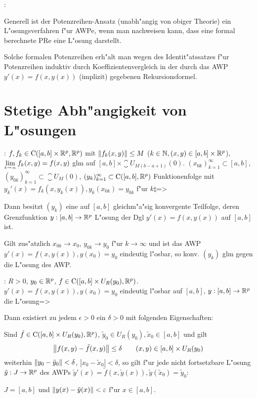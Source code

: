 \remark:{
  Generell ist der Potenzreihen-Ansatz (unabh"angig von obiger Theorie) ein
  L"osungsverfahren f"ur AWPe, wenn man nachweisen kann, dass eine
  formal berechnete PRe eine L"osung darstellt. 
  
  Solche formalen Potenzreihen erh"alt man wegen des Identit"atssatzes 
  f"ur Potenzreihen induktiv durch Koeffizientenvergleich in der
  durch das AWP $y'(x)=f(x,y(x))$ (implizit) gegebenen Rekursionsformel.
  }
\section{Stetige Abh"angigkeit von L"osungen}
\theorem:
  $f,f_k\in{\rm C}([a,b]\times\mathbb R^p,\mathbb R^p)$ mit
  ${\left\| f_k(x,y)\right\|}\leq M$ ($k\in\mathbb N,(x,y)\in[a,b]\times\mathbb R^p$),
  $\limes k->\infty f_k(x,y)=f(x,y)$ glm auf $[a,b]\times \closure{U_{M(b-a+1)}(0)}$.
  $(x_{0k})_{k=1}^\infty\subset [a,b]$, 
  $(y_{0k})_{k=1}^\infty\subset\closure{U_M(0)}$,
  $(y_k)_{k=1}^\infty\subset{\rm C}([a,b],\mathbb R^p)$ Funktionenfolge mit
  $y_k'(x)=f_k(x,y_k(x)),y_k(x_{0k})=y_{0k}$ f"ur $k\natural$=>{
  Dann besitzt $(y_k)$ eine auf $[a,b]$ gleichm"a"sig konvergente Teilfolge,
  deren Grenzfunktion $y:[a,b]\to\mathbb R^p$ L"osung der
  Dgl $y'(x)=f(x,y(x))$ auf $[a,b]$ ist.
  
  Gilt zus"atzlich $x_{0k}\to x_0$, $y_{0k}\to y_0$ f"ur $k\to\infty$ und
  ist das AWP $y'(x)=f(x,y(x)),y(x_0)=y_0$ eindeutig l"osbar, so konv.
  $(y_k)$ glm gegen die L"osung des AWP.
  }
\theorem:
  $R>0$, $y_0\in\mathbb R^p$, $f\in{\rm C}([a,b]\times U_R(y_0),\mathbb R^p)$.
  $y'(x)=f(x,y(x)),y(x_0)=y_0$ eindeutig l"osbar auf $[a,b]$, 
  $y:[a,b]\to\mathbb R^p$ die L"osung=>{
  Dann existiert zu jedem $\epsilon>0$ ein $\delta>0$ mit folgenden 
  Eigenschaften:
  
  Sind $\tilde f\in{\rm C}([a,b]\times U_R(y_0),\mathbb R^p)$, 
  $\tilde y_0\in U_R(y_0),\tilde x_0\in[a,b]$ und gilt
  \[{\left\| f(x,y)-\tilde f(x,y)\right\|}\leq\delta \qquad (x,y)\in[a,b]\times U_R(y_0)
    \]
  weiterhin ${\left\| y_0-\tilde y_0\right\|}<\delta$, $|x_0-\tilde x_0|<\delta$, so
  gilt f"ur jede nicht fortsetzbare L"osung $\tilde y:J\to\mathbb R^p$
  des AWPs $\tilde y'(x)=\tilde f(x,\tilde y(x)),\tilde y(\tilde x_0)=\tilde y_0$:
  
  $J=[a,b]$ und ${\left\| y(x)-\tilde y(x)\right\|}<\varepsilon$ f"ur $x\in[a,b]$.
  }
